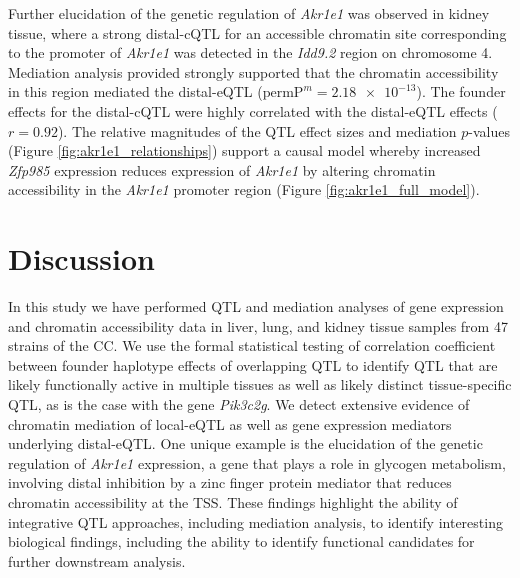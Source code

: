\documentclass[9pt,twocolumn,twoside]{gsajnl}
\newcommand{\permpmed}{\text{permP}^{m}}
\begin{document}
Further elucidation of the genetic regulation of \textit{Akr1e1} was observed in kidney tissue, where a strong distal-cQTL for an accessible chromatin site corresponding to the promoter of \textit{Akr1e1} was detected in the \textit{Idd9.2} region on chromosome 4. Mediation analysis provided strongly supported that the chromatin accessibility in this region mediated the distal-eQTL ($\permpmed = \num{2.18e-13}$). The founder effects for the distal-cQTL were highly correlated with the distal-eQTL effects ($r = 0.92$). The relative magnitudes of the QTL effect sizes and mediation $p$-values (Figure \ref{fig:akr1e1_relationships}) support a causal model whereby increased \textit{Zfp985} expression reduces expression of \textit{Akr1e1} by altering chromatin accessibility in the \textit{Akr1e1} promoter region (Figure \ref{fig:akr1e1_full_model}).  %

\section{Discussion}

In this study we have performed QTL and mediation analyses of gene expression and chromatin accessibility data in liver, lung, and kidney tissue samples from 47 strains of the CC. We use the formal statistical testing of correlation coefficient between founder haplotype effects of overlapping QTL to identify QTL that are likely functionally active in multiple tissues as well as likely distinct tissue-specific QTL, as is the case with the gene \textit{Pik3c2g}. We detect extensive evidence of chromatin mediation of local-eQTL as well as gene expression mediators underlying distal-eQTL. One unique example is the elucidation of the genetic regulation of \textit{Akr1e1} expression, a gene that plays a role in glycogen metabolism, involving distal inhibition by a zinc finger protein mediator that reduces chromatin accessibility at the TSS. These findings highlight the ability of integrative QTL approaches, including mediation analysis, to identify interesting biological findings, including the ability to identify functional candidates for further downstream analysis.
\end{document}
